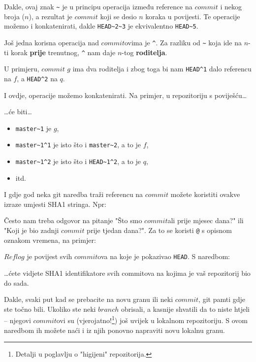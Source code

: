 Dakle, ovaj znak \verb+~+ je u principu operacija između reference na $commit$ i nekog broja ($n$), a rezultat je $commit$ koji se desio $n$ koraka u povijesti.
Te operacije možemo i konkatenirati, dakle \verb+HEAD~2~3+ je ekvivalentno \verb+HEAD~5+.

Još jedna korisna operacija nad $commit$ovima je \verb+^+.
Za razliku od \verb+~+ koja ide na $n$-ti korak \textbf{prije} trenutnog, \verb+^+ nam daje $n$-tog \textbf{roditelja}.

U primjeru, $commit$ $g$ ima dva roditelja i zbog toga bi nam \verb+HEAD^1+ dalo referencu na $f$, a \verb+HEAD^2+ na $q$.

I ovdje, operacije možemo konkatenirati.
Na primjer, u repozitoriju s poviješću\dots



\dots{}će biti\dots

\begin{itemize}
    \item \verb+master~1+ je $g$,
    \item \verb+master~1^1+ je isto što i \verb+master~2+, a to je $f$,
    \item \verb+master~1^2+ je isto što i \verb+HEAD~1^2+, a to je $q$,
    \item itd.
\end{itemize}

I gdje god neka git naredba traži referencu na $commit$ možete koristiti ovakve izraze umjesti SHA1 stringa.
Npr:





Često nam treba odgovor na pitanje "Što smo $commit$ali prije mjesec dana?" ili "Koji je bio zadnji $commit$ prije tjedan dana?".
Za to se koristi \verb+@+ s opisnom oznakom vremena, na primjer:





$Reflog$ je povijest svih $commit$ova na koje je pokazivao \verb+HEAD+.
S naredbom:


\dots{}ćete vidjete SHA1 identifikatore svih commitova na kojima je vaš repozitorij bio do sada. 

Dakle, svaki put kad se prebacite na novu granu ili neki $commit$, git pamti gdje ste točno bili.
Ukoliko ste neki $branch$ obrisali, a kasnije shvatili da to niste htjeli -- njegovi $commit$ovi su (vjerojatno!\footnote{Detalji u poglavlju o "higijeni" repozitorija.}) još uvijek u lokalnom repozitoriju. 
S ovom naredbom ih možete naći i iz njih ponovno napraviti novu lokalnu granu.
